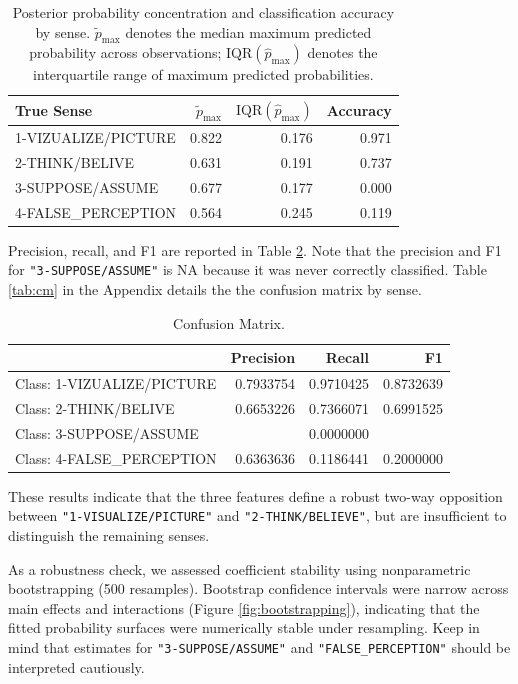 \documentclass[
]{article}
\begin{document}
\begin{table}[H]
\centering
\caption{\label{tab:unnamed-chunk-9}Posterior probability concentration and classification accuracy by sense. $\tilde{p}_{\max}$ denotes the median maximum predicted probability across observations; $\text{IQR}(\hat{p}_{\max})$ denotes the interquartile range of maximum predicted probabilities.\label{tab:senseAccuracy}}
\centering
\begin{tabular}[t]{lrrr}
\toprule
True Sense & $\tilde{p}_{\max}$ & $\text{IQR}(\hat{p}_{\max})$ & Accuracy\\
\midrule
1-VIZUALIZE/PICTURE & 0.822 & 0.176 & 0.971\\
2-THINK/BELIVE & 0.631 & 0.191 & 0.737\\
3-SUPPOSE/ASSUME & 0.677 & 0.177 & 0.000\\
4-FALSE\_PERCEPTION & 0.564 & 0.245 & 0.119\\
\bottomrule
\end{tabular}
\end{table}

Precision, recall, and F1 are reported in Table \ref{tab:cmDetail}. Note
that the precision and F1 for \texttt{"3-SUPPOSE/ASSUME"} is NA because
it was never correctly classified. Table \ref{tab:cm} in the Appendix
details the the confusion matrix by sense.

\begin{table}[H]
\centering
\caption{\label{tab:unnamed-chunk-10}Confusion Matrix.\label{tab:cmDetail}}
\centering
\begin{tabular}[t]{lrrr}
\toprule
  & Precision & Recall & F1\\
\midrule
Class: 1-VIZUALIZE/PICTURE & 0.7933754 & 0.9710425 & 0.8732639\\
Class: 2-THINK/BELIVE & 0.6653226 & 0.7366071 & 0.6991525\\
Class: 3-SUPPOSE/ASSUME &  & 0.0000000 & \\
Class: 4-FALSE\_PERCEPTION & 0.6363636 & 0.1186441 & 0.2000000\\
\bottomrule
\end{tabular}
\end{table}

These results indicate that the three features define a robust two-way
opposition between \texttt{"1-VISUALIZE/PICTURE"} and
\texttt{"2-THINK/BELIEVE"}, but are insufficient to distinguish the
remaining senses.

As a robustness check, we assessed coefficient stability using
nonparametric bootstrapping (500 resamples). Bootstrap confidence
intervals were narrow across main effects and interactions (Figure
\ref{fig:bootstrapping}), indicating that the fitted probability
surfaces were numerically stable under resampling. Keep in mind that
estimates for \texttt{"3-SUPPOSE/ASSUME"} and
\texttt{"FALSE\_PERCEPTION"} should be interpreted cautiously.
\end{document}
